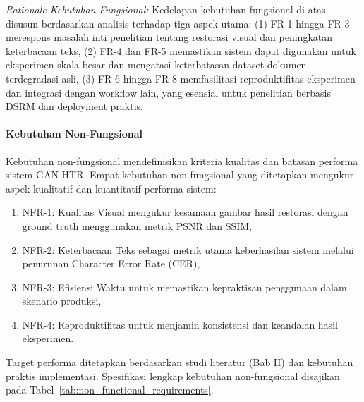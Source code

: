\documentclass[12pt,a4paper]{article}
\begin{document}
\textit{Rationale Kebutuhan Fungsional:} Kedelapan kebutuhan fungsional di atas disusun berdasarkan analisis terhadap tiga aspek utama: (1) FR-1 hingga FR-3 merespons masalah inti penelitian tentang restorasi visual dan peningkatan keterbacaan teks, (2) FR-4 dan FR-5 memastikan sistem dapat digunakan untuk eksperimen skala besar dan mengatasi keterbatasan dataset dokumen terdegradasi asli, (3) FR-6 hingga FR-8 memfasilitasi reproduktifitas eksperimen dan integrasi dengan workflow lain, yang esensial untuk penelitian berbasis DSRM dan deployment praktis.

\paragraph{Kebutuhan Non-Fungsional}

Kebutuhan non-fungsional mendefinisikan kriteria kualitas dan batasan performa sistem GAN-HTR. Empat kebutuhan non-fungsional yang ditetapkan mengukur aspek kualitatif dan kuantitatif performa sistem:

\begin{enumerate}[nosep]
    \item NFR-1: Kualitas Visual mengukur kesamaan gambar hasil restorasi dengan ground truth menggunakan metrik PSNR dan SSIM,
    \item NFR-2: Keterbacaan Teks sebagai metrik utama keberhasilan sistem melalui penurunan Character Error Rate (CER),
    \item NFR-3: Efisiensi Waktu untuk memastikan kepraktisan penggunaan dalam skenario produksi,
    \item NFR-4: Reproduktifitas untuk menjamin konsistensi dan keandalan hasil eksperimen.
\end{enumerate}

Target performa ditetapkan berdasarkan studi literatur (Bab II) dan kebutuhan praktis implementasi. Spesifikasi lengkap kebutuhan non-fungsional disajikan pada Tabel~\ref{tab:non_functional_requirements}.
\end{document}
